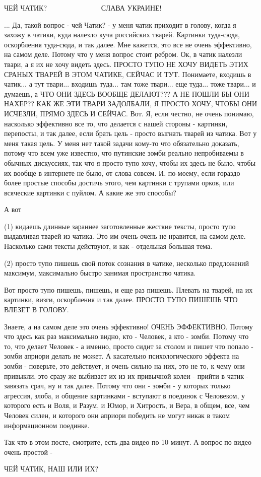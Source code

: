  
 
 
 
 

ЧЕЙ ЧАТИК?
💛 💙 💛 💙 💛 💙 💛 💙 💛 💙 💛 💙
СЛАВА УКРАИНЕ! 

... Да, такой вопрос - чей Чатик? -  у меня чатик приходит в голову, когда я захожу в чатики, куда налезло куча российских тварей. Картинки туда-сюда, оскорбления туда-сюда, и так далее. Мне кажется, это все не очень эффективно, на самом деле. Потому что у меня вопрос стоит ребром. Ок, в чатик налезли твари, а я их не хочу видеть здесь. ПРОСТО ТУПО НЕ ХОЧУ ВИДЕТЬ ЭТИХ СРАНЫХ ТВАРЕЙ В ЭТОМ ЧАТИКЕ, СЕЙЧАС И ТУТ. Понимаете, входишь в чатик... а тут твари...
входишь туда... там тоже твари... еще туда... тоже твари... и думаешь, а ЧТО ОНИ ЗДЕСЬ ВООБЩЕ ДЕЛАЮТ??? А НЕ ПОШЛИ БЫ ОНИ НАХЕР?? КАК ЖЕ ЭТИ ТВАРИ ЗАДОЛБАЛИ, Я ПРОСТО ХОЧУ, ЧТОБЫ ОНИ ИСЧЕЗЛИ, ПРЯМО ЗДЕСЬ И СЕЙЧАС.
Вот. Я, если честно, не очень понимаю, насколько эффективно все то, что делается с нашей стороны - картинки, перепосты, и так далее, если брать цель - просто выгнать тварей из чатика. Вот у меня такая цель. У меня нет такой задачи кому-то что обязательно доказать, потому что всем уже известно, что путинские зомби реально непробиваемы в обычных дискуссиях, так что я просто тупо хочу, чтобы их здесь не было, чтобы их вообще в интернете не было, от слова совсем. И, по-моему, если гораздо более простые способы достичь этого, чем картинки с трупами орков, или всяческие картинки с пуйлом. А какие же это способы? 

А вот 

(1) кидаешь длинные зараннее заготовленные жесткие тексты, просто тупо
выдавливая тварей из чатика. Это им очень-очень не нравится, на самом деле.
Насколько сами тексты действуют, и как - отдельная большая тема. 

(2) просто тупо пишешь свой поток сознания в чатике, несколько предложений
максимум, максимально быстро занимая пространство чатика.

Вот просто тупо пишешь, пишешь, и еще раз пишешь. Плевать на тварей, на их
картинки, визги, оскорбления и так далее. ПРОСТО ТУПО ПИШЕШЬ ЧТО ВЛЕЗЕТ В
ГОЛОВУ.

Знаете, а на самом деле это очень эффективно! ОЧЕНЬ ЭФФЕКТИВНО. Потому что
здесь как раз максимально видно, кто - Человек, а кто - зомби. Потому что то,
что делает Человек - а именно, просто сидит за столом и пишет что попало -
зомби априори делать не может. А касательно психологического эффекта на зомби -
поверьте, это действует, и очень сильно на них, это не то, к чему они привыкли,
это сразу же выбивает их из их привычной колеи - прийти в чатик - завязать
срач, ну и так далее. Потому что они - зомби - у которых только агрессия,
злоба, и общение картинками - вступают в поединок с Человеком, у которого есть
и Воля, и Разум, и Юмор, и Хитрость, и Вера, в общем, все, чем Человек силен, и
которого они априори победить не могут никак в таком информационном поединке.

Так что в этом посте, смотрите, есть два видео по 10 минут. А вопрос по видео очень простой - 

ЧЕЙ ЧАТИК, НАШ ИЛИ ИХ?
